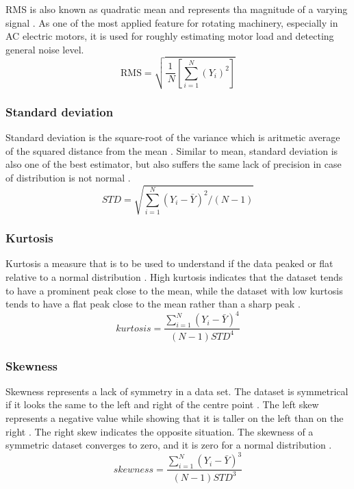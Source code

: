 RMS is also known as quadratic mean and represents tha magnitude of a varying signal \cite{sait2011review,shukla2015analysis}. As one of the most applied feature for rotating machinery, especially in AC electric motors, it is used for roughly estimating motor load and detecting general noise level.
\begin{equation}
\text{RMS}=\sqrt{\frac{1}{{~N}}\left[\sum_{{i}=1}^{{N}}\left({Y}_{{i}}\right)^{2}\right]}	
\label{RMS}
\end{equation}
\subsubsection{Standard deviation}

Standard deviation is the square-root of the variance which is aritmetic average of the squared distance from the mean \cite{shukla2015analysis}. Similar to mean, standard deviation is also one of the best estimator, but also suffers the same lack of precision in case of distribution is not normal \cite{croarkin2012handbook}.
\begin{equation}
\textit{STD}=\sqrt{\sum_{i=1}^{N}\left(Y_{i}-\bar{Y}\right)^{2} /(N-1)}
\label{std}
\end{equation}

\subsubsection{Kurtosis} 

Kurtosis a measure that is to be used to understand if the data peaked or flat relative to a normal distribution \cite{shukla2015analysis}. High kurtosis indicates that the dataset tends to have a prominent peak close to the mean, while the dataset with low kurtosis tends to have a flat peak close to the mean rather than a sharp peak \cite{croarkin2012handbook}.
\begin{equation}
\textit{kurtosis}=\frac{\sum_{i=1}^{N}\left(Y_{i}-\bar{Y}\right)^{4}}{(N-1) STD^{4}}
\label{kurtosis}
\end{equation}
\subsubsection{Skewness} 

Skewness represents a lack of symmetry in a data set. The dataset is symmetrical if it looks the same to the left and right of the centre point \cite{shukla2015analysis}. The left skew represents a negative value while showing that it is taller on the left than on the right \cite{croarkin2012handbook}. The right skew indicates the opposite situation. The skewness of a symmetric dataset converges to zero, and it is zero for a normal distribution \cite{croarkin2012handbook}.
\begin{equation}
\textit{skewness}=\frac{\sum_{i=1}^{N}\left(Y_{i}-\bar{Y}\right)^{3}}{(N-1) STD^{3}}
\label{skewness}
\end{equation}
